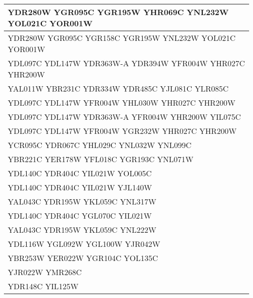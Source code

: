 \begin{longtable}{| m{27em} |}
\hline
YDR280W YGR095C YGR195W YHR069C YNL232W YOL021C YOR001W \\
\hline
YDR280W YGR095C YGR158C YGR195W YNL232W YOL021C YOR001W \\
\hline
YDL097C YDL147W YDR363W-A YDR394W YFR004W YHR027C YHR200W \\
\hline
YAL011W YBR231C YDR334W YDR485C YJL081C YLR085C \\
\hline
YDL097C YDL147W YFR004W YHL030W YHR027C YHR200W \\
\hline
YDL097C YDL147W YDR363W-A YFR004W YHR200W YIL075C \\
\hline
YDL097C YDL147W YFR004W YGR232W YHR027C YHR200W \\
\hline
YCR095C YDR067C YHL029C YNL032W YNL099C \\
\hline
YBR221C YER178W YFL018C YGR193C YNL071W \\
\hline
YDL140C YDR404C YIL021W YOL005C \\
\hline
YDL140C YDR404C YIL021W YJL140W \\
\hline
YAL043C YDR195W YKL059C YNL317W \\
\hline
YDL140C YDR404C YGL070C YIL021W \\
\hline
YAL043C YDR195W YKL059C YNL222W \\
\hline
YDL116W YGL092W YGL100W YJR042W \\
\hline
YBR253W YER022W YGR104C YOL135C \\
\hline
YJR022W YMR268C \\
\hline
YDR148C YIL125W \\
\hline
\end{longtable}